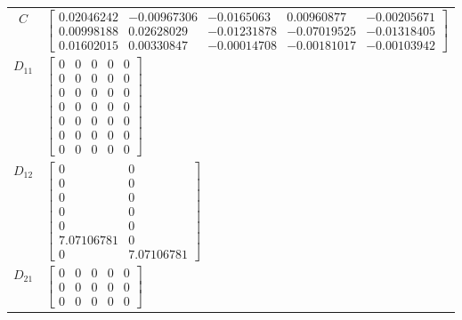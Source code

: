 \begin{tabular}{cl}
   $C$    & $\left[\begin{matrix}0.02046242 & -0.00967306 & -0.0165063 & 0.00960877 & -0.00205671\\0.00998188 & 0.02628029 & -0.01231878 & -0.07019525 & -0.01318405\\0.01602015 & 0.00330847 & -0.00014708 & -0.00181017 & -0.00103942\end{matrix}\right]$                                                                                                                                                   \\
 $D_{11}$ & $\left[\begin{matrix}0 & 0 & 0 & 0 & 0\\0 & 0 & 0 & 0 & 0\\0 & 0 & 0 & 0 & 0\\0 & 0 & 0 & 0 & 0\\0 & 0 & 0 & 0 & 0\\0 & 0 & 0 & 0 & 0\\0 & 0 & 0 & 0 & 0\end{matrix}\right]$                                                                                                                                                                                                                      \\
 $D_{12}$ & $\left[\begin{matrix}0 & 0\\0 & 0\\0 & 0\\0 & 0\\0 & 0\\7.07106781 & 0\\0 & 7.07106781\end{matrix}\right]$                                                                                                                                                                                                                                                                                        \\
 $D_{21}$ & $\left[\begin{matrix}0 & 0 & 0 & 0 & 0\\0 & 0 & 0 & 0 & 0\\0 & 0 & 0 & 0 & 0\end{matrix}\right]$                                                                                                                                                                                                                                                                                                  \\
\hline
\end{tabular}